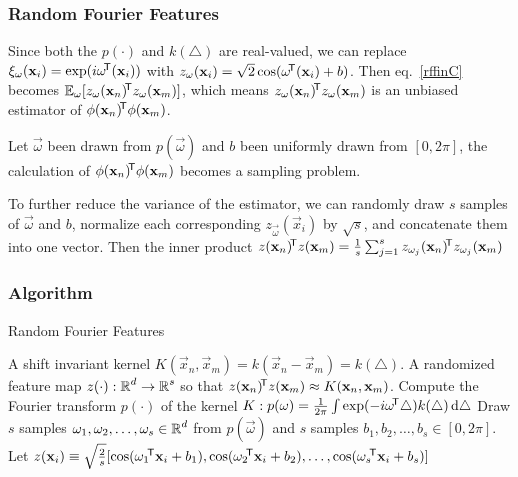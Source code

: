 \documentclass[10pt]{../Formats/RU}
\begin{document}
\begin{frame}
  \frametitle{Random Fourier Features}
  Since both the $p(\cdot)$ and $k(\triangle)$ are real-valued, we can replace $\xi_{\mathbf{\omega}}(\mathbf{x}_i)=\exp(i\mathbf{\omega}\!^{\mathsf{T}}(\mathbf{x}_i))$ with
  $
  z_{\mathbf{\omega}}(\mathbf{x}_i)=\sqrt{2}\cos(\mathbf{\omega}\!^{\mathsf{T}}(\mathbf{x}_i)+b)$. Then eq.~\eqref{rffinC} becomes $\mathbb{E}_{\mathbf{\omega}}[z_{\mathbf{\omega}}(\mathbf{x}_n)\!^{\mathsf{T}} z_{\mathbf{\omega}}(\mathbf{x}_m)]$, which means $z_{\mathbf{\omega}}(\mathbf{x}_n)\!^{\mathsf{T}} z_{\mathbf{\omega}}(\mathbf{x}_m)$ is an unbiased estimator of $\phi(\mathbf{x}_n)\!^{\mathsf{T}}\phi(\mathbf{x}_m)$.

  Let $\vec{\omega}$ been drawn from $p(\vec{\omega})$ and $b$ been uniformly drawn from $[0, 2\pi]$, the calculation of $\phi(\mathbf{x}_n)\!^{\mathsf{T}}\phi(\mathbf{x}_m)$ becomes a sampling problem.

  To further reduce the variance of the estimator, we can randomly draw $s$ samples of $\vec{\omega}$ and $b$, normalize each corresponding $z_{\vec{\omega}}(\vec{x}_i)$ by $\sqrt{s}$, and concatenate them into one vector. Then the inner product $z(\mathbf{x}_n)\!^{\mathsf{T}} z(\mathbf{x}_m)=\frac{1}{s}\sum_{j=1}^{s}z_{\mathbf{\omega}_j}(\mathbf{x}_n)\!^{\mathsf{T}} z_{\mathbf{\omega}_j}(\mathbf{x}_m)$
\end{frame}
\begin{frame}
  \frametitle{Algorithm}
  \begin{algorithm}[H]
    \caption{Random Fourier Features}\label{RFF}
    \begin{algorithmic}
    \Require A shift invariant kernel $K(\vec{x}_n, \vec{x}_m) = k(\vec{x}_n- \vec{x}_m)=k(\triangle)$.
    \Ensure A randomized feature map $z(\cdot): \operatorname{\mathbb{R}}^d\rightarrow\operatorname{\mathbb{R}}^s$ so that $z(\mathbf{x}_n)\!^{\mathsf{T}} z(\mathbf{x}_m)\approx K(\mathbf{x}_n, \mathbf{x}_m)$.
    \State Compute the Fourier transform $p(\cdot)$ of the kernel $K: p(\mathbf{\omega})=\frac{1}{2\pi}\int \exp(-i\mathbf{\omega}\!^{\mathsf{T}}\triangle)k(\triangle)\mathop{}\!\mathrm{d}\triangle$
    \State Draw $s$ \iid samples $\mathbf{\omega}_1, \mathbf{\omega}_2, \ldots, \mathbf{\omega}_s \in \operatorname{\mathbb{R}}^d$ from $p(\vec{\omega})$ and $s$ \iid samples $b_1, b_2, \ldots, b_s \in [0, 2\pi]$.
    \State Let $z(\mathbf{x}_i)\equiv \sqrt{\frac{2}{s}}[\cos(\mathbf{\omega}_1\!^{\mathsf{T}}\mathbf{x}_i+b_1), \cos(\mathbf{\omega}_2\!^{\mathsf{T}}\mathbf{x}_i+b_2), \ldots, \cos(\mathbf{\omega}_s\!^{\mathsf{T}}\mathbf{x}_i+b_s)]$
    \end{algorithmic}
  \end{algorithm}
\end{frame}
\end{document}
